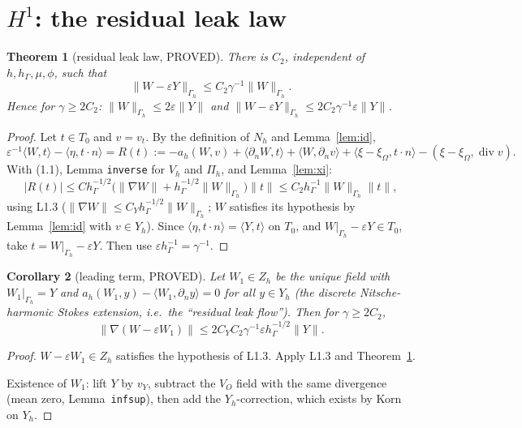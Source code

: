 \documentclass[11pt]{article}
\newtheorem{theorem}{Theorem}[section]
\newtheorem{corollary}[theorem]{Corollary}
\theoremstyle{remark}
\newcommand{\hG}{h_\Gamma}
\newcommand{\Gh}{\Gamma_h}
\newcommand{\ip}[2]{\langle #1,#2\rangle}
\begin{document}
\section{$H^1$: the residual leak law}
\begin{theorem}[residual leak law, PROVED]\label{thm:leak}
There is $C_2$, independent of $h,\hG,\mu,\phi$, such that
\[
\|W-\varepsilon Y\|_{\Gh}\le C_2\gamma^{-1}\|W\|_{\Gh}.
\]
Hence for $\gamma\ge2C_2$: $\|W\|_{\Gh}\le2\varepsilon\|Y\|$ and $\|W-\varepsilon Y\|_{\Gh}\le2C_2\gamma^{-1}\varepsilon\|Y\|$.
\end{theorem}
\begin{proof}
Let $t\in T_0$ and $v=v_t$. By the definition of $N_h$ and Lemma~\ref{lem:id},
\[
\varepsilon^{-1}\ip{W}{t}-\ip{\eta}{t\cdot n}=R(t):=-a_h(W,v)+\ip{\partial_nW}{t}+\ip{W}{\partial_nv}+\ip{\xi-\xi_\Omega}{t\cdot n}-(\xi-\xi_\Omega,\operatorname{div}v).
\]
With (1.1), Lemma \texttt{inverse} for $V_h$ and $\Pi_h$, and Lemma~\ref{lem:xi}:
\[
|R(t)|\le C\hG^{-1/2}\big(\|\nabla W\|+\hG^{-1/2}\|W\|_{\Gh}\big)\|t\|\le C_2\hG^{-1}\|W\|_{\Gh}\|t\|,
\]
using L1.3 ($\|\nabla W\|\le C_Y\hG^{-1/2}\|W\|_{\Gh}$; $W$ satisfies its hypothesis by Lemma~\ref{lem:id} with $v\in Y_h$).
Since $\ip{\eta}{t\cdot n}=\ip{Y}{t}$ on $T_0$, and $W|_{\Gh}-\varepsilon Y\in T_0$, take $t=W|_{\Gh}-\varepsilon Y$. Then use
$\varepsilon\hG^{-1}=\gamma^{-1}$.
\end{proof}

\begin{corollary}[leading term, PROVED]\label{cor:lead}
Let $W_1\in Z_h$ be the unique field with $W_1|_{\Gh}=Y$ and $a_h(W_1,y)-\ip{W_1}{\partial_ny}=0$ for all $y\in Y_h$ (the
discrete Nitsche-harmonic Stokes extension, i.e.\ the ``residual leak flow''). Then for $\gamma\ge2C_2$,
\[
\|\nabla(W-\varepsilon W_1)\|\le 2C_YC_2\gamma^{-1}\varepsilon\hG^{-1/2}\|Y\|.
\]
\end{corollary}
\begin{proof}
$W-\varepsilon W_1\in Z_h$ satisfies the hypothesis of L1.3. Apply L1.3 and Theorem~\ref{thm:leak}.

Existence of $W_1$: lift $Y$ by $v_Y$, subtract the $V_O$ field with the same divergence (mean zero, Lemma~\texttt{infsup}),
then add the $Y_h$-correction, which exists by Korn on $Y_h$.
\end{proof}
\end{document}
